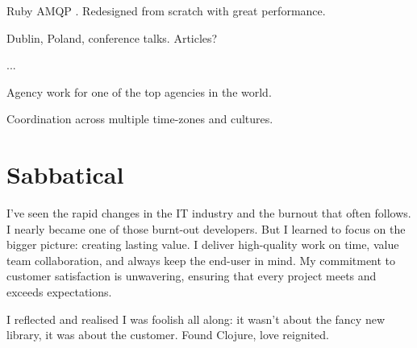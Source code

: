 \startitemize
  \item Ruby AMQP . Redesigned from scratch with great performance.
  \item Dublin, Poland, conference talks. Articles?
  \item ...
\stopitemize


\startitemize
  \item Agency work for one of the top agencies in the world.
  \item Coordination across multiple time-zones and cultures.
\stopitemize

\section{Sabbatical}
I’ve seen the rapid changes in the IT industry and the burnout that often follows. I nearly became one of those burnt-out developers. But I learned to focus on the bigger picture: creating lasting value. I deliver high-quality work on time, value team collaboration, and always keep the end-user in mind. My commitment to customer satisfaction is unwavering, ensuring that every project meets and exceeds expectations.

I reflected and realised I was foolish all along: it wasn't about the fancy new library, it was about the customer. Found Clojure, love reignited.


